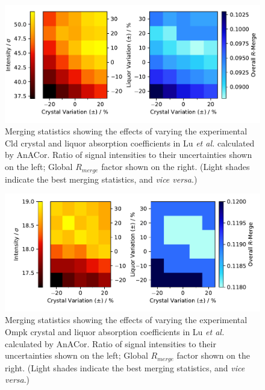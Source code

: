 \begin{figure}[h]
    \centering
    \includegraphics[width = \textwidth]{plots/exp0/cld_merged_stats.pdf} 
    \caption{Merging statistics showing the effects of varying the experimental Cld crystal and liquor absorption coefficients in Lu \textit{et al.} \cite{Lu2024} calculated by AnACor. Ratio of signal intensities to their uncertainties shown on the left; Global $R_{merge}$ factor shown on the right. (Light shades indicate the best merging statistics, and \textit{vice versa}.)}
    \label{fig:cld_stats}
\end{figure}

\begin{figure}[h]
    \centering
    \includegraphics[width = \textwidth]{plots/exp0/ompk_merged_stats.pdf}
    \caption{Merging statistics showing the effects of varying the experimental Ompk crystal and liquor absorption coefficients in Lu \textit{et al.} \cite{Lu2024} calculated by AnACor. Ratio of signal intensities to their uncertainties shown on the left; Global $R_{merge}$ factor shown on the right. (Light shades indicate the best merging statistics, and \textit{vice versa}.)}
    \label{fig:ompk_stats}
\end{figure}



